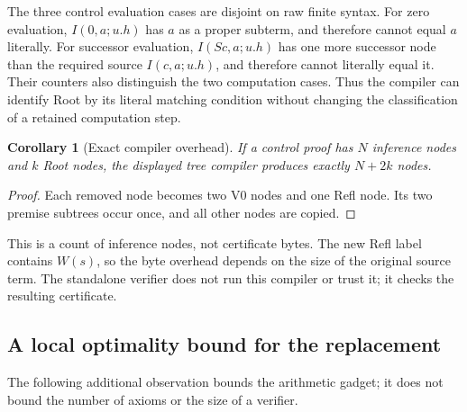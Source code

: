 \documentclass[11pt,letterpaper]{article}
\newtheorem{corollary}[theorem]{Corollary}
\theoremstyle{definition}
\begin{document}
The three control evaluation cases are disjoint on raw finite syntax.
For zero evaluation, $I(0,a;u.h)$ has $a$ as a proper subterm, and
therefore cannot equal $a$ literally. For successor evaluation,
$I(Sc,a;u.h)$ has one more successor node than the required source
$I(c,a;u.h)$, and therefore cannot literally equal it. Their counters
also distinguish the two computation cases. Thus the compiler can
identify Root by its literal matching condition without changing
the classification of a retained computation step.

\begin{corollary}[Exact compiler overhead]
If a control proof has $N$ inference nodes and $k$ Root nodes,
the displayed tree compiler produces exactly $N+2k$ nodes.
\end{corollary}
\begin{proof}
Each removed node becomes two V0 nodes and one Refl node. Its two
premise subtrees occur once, and all other nodes are copied.
\end{proof}
This is a count of inference nodes, not certificate bytes. The new
Refl label contains $W(s)$, so the byte overhead depends on the
size of the original source term. The standalone verifier does not
run this compiler or trust it; it checks the resulting certificate.

\subsection{A local optimality bound for the replacement}

The following additional observation bounds the arithmetic gadget;
it does not bound the number of axioms or the size of a verifier.
\end{document}
